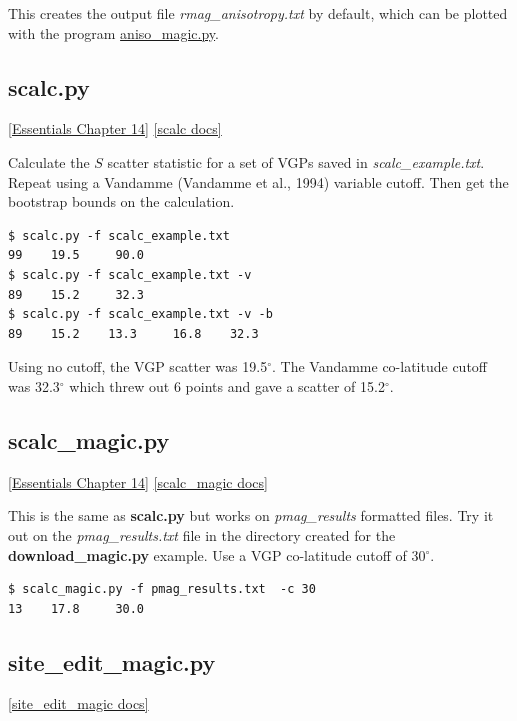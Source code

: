 \documentclass[11pt]{book}
\begin{document}
{{{This creates the output file {\it rmag\_anisotropy.txt}  by default, which can be plotted with the program \href{#aniso_magic.py}{aniso\_magic.py}.



\subsection{scalc.py}
\href{http://earthref.org/MAGIC/books/Tauxe/Essentials/WebBook3ch14.html#ch14}{[Essentials Chapter 14]}
\href{https://github.com/PmagPy/PmagPy/blob/master/programs/scalc.py}{[scalc docs]}


Calculate the $S$ scatter statistic for a set of VGPs saved in {\it scalc\_example.txt}.  Repeat using a Vandamme (Vandamme et al., 1994) \nocite{vandamme94} variable cutoff.  Then get the bootstrap bounds on the calculation.

\begin{verbatim}
$ scalc.py -f scalc_example.txt
99    19.5     90.0
$ scalc.py -f scalc_example.txt -v
89    15.2     32.3
$ scalc.py -f scalc_example.txt -v -b
89    15.2    13.3     16.8    32.3
\end{verbatim}

Using no cutoff, the VGP scatter was 19.5$^{\circ}$.  The Vandamme co-latitude cutoff was 32.3$^{\circ}$ which threw out 6 points and gave a scatter of 15.2$^{\circ}$.


\subsection{scalc\_magic.py}
\href{http://earthref.org/MAGIC/books/Tauxe/Essentials/WebBook3ch14.html#ch14}{[Essentials Chapter 14]}
\href{https://github.com/PmagPy/PmagPy/blob/master/programs/scalc_magic.py}{[scalc\_magic docs]}

This is the same as {\bf scalc.py} but works on {\it pmag\_results} formatted files.   Try it out on the {\it pmag\_results.txt} file in the directory created for the {\bf download\_magic.py} example. Use a VGP co-latitude cutoff of 30$^{\circ}$.

\begin{verbatim}
$ scalc_magic.py -f pmag_results.txt  -c 30
13    17.8     30.0

\end{verbatim}


\subsection{site\_edit\_magic.py}
\href{https://github.com/PmagPy/PmagPy/blob/master/programs/site_edit_magic.py}{[site\_edit\_magic docs]}

}}}
\end{document}
